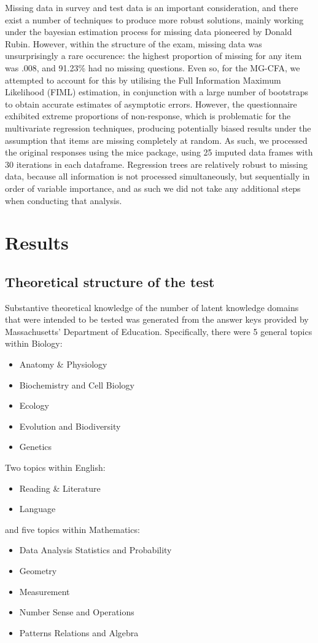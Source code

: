 \documentclass{article}\usepackage[]{graphicx}\usepackage[]{color}
\begin{document}
Missing data in survey and test data is an important consideration, and there exist a number of techniques to produce more robust solutions, mainly working under the bayesian estimation process for missing data pioneered by Donald Rubin\cite{rubin}. However, within the structure of the exam, missing data was unsurprisingly a rare occurence: the highest proportion of missing for any item was .008, and 91.23\% had no missing questions. Even so, for the MG-CFA, we attempted to account for this by utilising the Full Information Maximum Likelihood (FIML) estimation, in conjunction with a large number of bootstraps to obtain accurate estimates of asymptotic errors. However, the questionnaire exhibited extreme proportions of non-response, which is problematic for the multivariate regression techniques, producing potentially biased results under the assumption that items are missing completely at random. As such, we processed the original responses using the mice package\cite{mice}, using 25 imputed data frames with 30 iterations in each dataframe. Regression trees are relatively robust to missing data, because all information is not processed simultaneously, but sequentially in order of variable importance, and as such we did not take any additional steps when conducting that analysis.
\section{Results}
\subsection{Theoretical structure of the test}
Substantive theoretical knowledge of the number of latent knowledge domains that were intended to be tested was generated from the answer keys provided by Massachusetts' Department of Education. Specifically, there were 5 general topics within Biology:
\begin{itemize}
\item{Anatomy \& Physiology}
\item{Biochemistry and Cell Biology}
\item{Ecology}
\item{Evolution and Biodiversity}
\item{Genetics}
\end{itemize}
Two topics within English:
\begin{itemize}
\item{Reading \& Literature}
\item{Language}
\end{itemize}
and five topics within Mathematics:
\begin{itemize}
\item{Data Analysis  Statistics  and Probability}
\item{Geometry}
\item{Measurement}
\item{Number Sense and Operations}
\item{Patterns Relations and Algebra}
\end{itemize}
\end{document}
